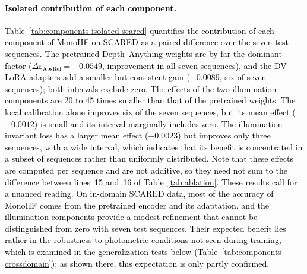 \documentclass[a4paper,fleqn]{cas-dc}
\begin{document}
%
\textcolor{black}
{
\paragraph{Isolated contribution of each component.}
Table~\ref{tab:components-isolated-scared} quantifies the contribution of each component of MonoIIF on SCARED as a paired difference over the seven test sequences. The pretrained Depth~Anything weights are by far the dominant factor ($\Delta\varepsilon_\textrm{AbsRel}=-0.0549$, improvement in all seven sequences), and the DV-LoRA adapters add a smaller but consistent gain ($-0.0089$, six of seven sequences); both intervals exclude zero. The effects of the two illumination components are 20 to 45 times smaller than that of the pretrained weights. The local calibration alone improves six of the seven sequences, but its mean effect ($-0.0012$) is small and its interval marginally includes zero. The illumination-invariant loss has a larger mean effect ($-0.0023$) but improves only three sequences, with a wide interval, which indicates that its benefit is concentrated in a subset of sequences rather than uniformly distributed. 
Note that these effects are computed per sequence and are not additive, so they need not sum to the difference between lines~15 and~16 of Table~\ref{tab:ablation}.
These results call for a nuanced reading. On in-domain SCARED data, most of the accuracy of MonoIIF comes from the pretrained encoder and its adaptation, and the illumination components provide a modest refinement that cannot be distinguished from zero with seven test sequences. Their expected benefit lies rather in the robustness to photometric conditions not seen during training, which is examined in the generalization tests below \textcolor{black}{(Table~\ref{tab:components-crossdomain}); as shown there, this expectation is only partly confirmed.}}
%
\begin{table}[t]
\centering
\color{red}
\caption{\textcolor{black}{Change brought by the illumination components to the three proposed models on SCARED, computed from the values of Table~\ref{tab:ablation}: each model is compared with the configuration of the same backbone given in the second column. Relative change for the four error criteria (negative: lower error) and absolute change for $\delta_{1.25}$. Each configuration corresponds to a single training run.}}
\label{tab:components-relative}
\end{table}
\end{document}
